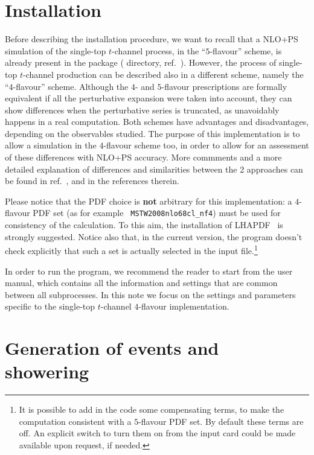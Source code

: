 \documentclass[paper]{JHEP3}
\newcommand{\tmtexttt}[1]{{\ttfamily{#1}}}
\begin{document}
\section{Installation}
Before describing the installation procedure, we want to recall that a
NLO+PS simulation of the single-top $t$-channel process, in the
``$5$-flavour'' scheme, is already present in the \tmtexttt{POWHEG
  BOX} package (\tmtexttt{POWHEG-BOX/ST\_tch} directory,
ref.~\cite{Alioli:2009je}). However, the process of single-top
$t$-channel production can be described also in a different scheme,
namely the ``$4$-flavour'' scheme. Although the $4$- and $5$-flavour
prescriptions are formally equivalent if all the perturbative
expansion were taken into account, they can show differences when the
perturbative series is truncated, as unavoidably happens in a real
computation. Both schemes have advantages and disadvantages, depending
on the observables studied. The purpose of this implementation is to
allow a simulation in the $4$-flavour scheme too, in order to allow
for an assessment of these differences with NLO+PS accuracy. More
commments and a more detailed explanation of differences and
similarities between the 2 approaches can be found in
ref.~\cite{Frederix:2012dh}, and in the references therein.

Please notice that the PDF choice is \textbf{not} arbitrary for this
implementation: a $4$-flavour PDF set (as for example {\tt
  MSTW2008nlo68cl\_nf4}) must be used for consistency of the
calculation. To this aim, the installation of
LHAPDF~\cite{Whalley:2005nh} is strongly suggested. Notice also that,
in the current version, the program doesn't check explicitly that such
a set is actually selected in the input file.\footnote{It is possible
  to add in the code some compensating terms, to make the computation
  consistent with a $5$-flavour PDF set. By default these terms are
  off. An explicit switch to turn them on from the input card could be
  made available upon request, if needed.}

In order to run the \tmtexttt{POWHEG BOX} program, we recommend the
reader to start from the \tmtexttt{POWHEG BOX} user manual, which
contains all the information and settings that are common between all
subprocesses. In this note we focus on the settings and parameters
specific to the single-top $t$-channel $4$-flavour implementation.

\section{Generation of events and showering}
\end{document}
